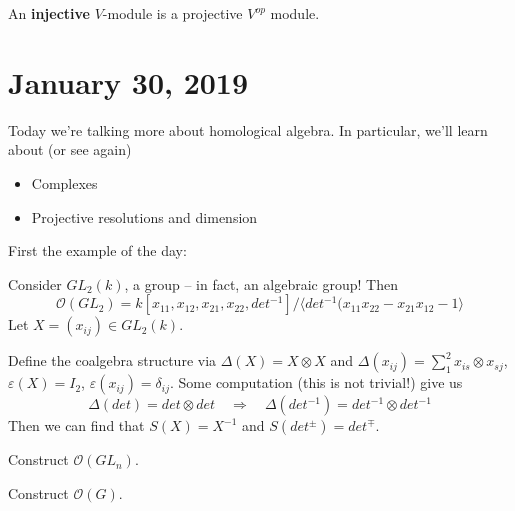 \documentclass[12pt]{article}
\theoremstyle{break}
\theoremstyle{nonumberbreak}
\theoremstyle{changebreak}
\theoremstyle{break}
\theoremstyle{nonumberbreak}
\theoremstyle{nonumberplain}
\theoremstyle{change}
\begin{document}
\begin{defn}
	An \textbf{injective} $V$-module is a projective $V^{op}$ module.
\end{defn}

\section{January 30, 2019}
Today we're talking more about homological algebra. In particular, we'll learn about (or see again)
\begin{itemize}
	\item Complexes
	\item Projective resolutions and dimension
\end{itemize}
First the example of the day:
\begin{ex}
	Consider $GL_2(k)$, a group -- in fact, an algebraic group! Then 
	\[\mathcal{O}(GL_2)=k[x_{11},x_{12},x_{21},x_{22},det^{-1}]/\langle det^{-1}(x_{11}x_{22}-x_{21}x_{12}-1\rangle\]
	Let $X=(x_{ij})\in GL_2(k)$.

	Define the coalgebra structure via $\Delta(X)=X\otimes X$ and $\Delta(x_{ij})=\sum_1^2 x_{is}\otimes x_{sj}$,
	$\varepsilon(X)=I_2$, $\varepsilon(x_{ij})=\delta_{ij}$. Some computation (this is not trivial!) give us
	\[\Delta(det)=det\otimes det\quad\Rightarrow\quad \Delta(det^{-1})=det^{-1}\otimes det^{-1}\]
	Then we can find that $S(X)=X^{-1}$ and $S(det^{\pm})=det^{\mp}$.
\end{ex}
\begin{prob}
	Construct $\mathcal{O}(GL_n)$.
\end{prob}
\begin{prob}
	Construct $\mathcal{O}(G)$.
\end{prob}
\end{document}
